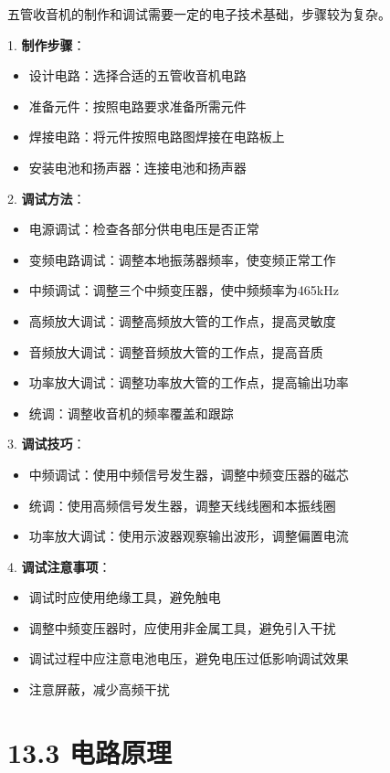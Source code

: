 \documentclass[12pt,UTF8]{ctexbook}
\begin{document}
五管收音机的制作和调试需要一定的电子技术基础，步骤较为复杂。

1. \textbf{制作步骤}：
   \begin{itemize}[leftmargin=3.5em]
   \item 设计电路：选择合适的五管收音机电路
   \item 准备元件：按照电路要求准备所需元件
   \item 焊接电路：将元件按照电路图焊接在电路板上
   \item 安装电池和扬声器：连接电池和扬声器
   \end{itemize}

2. \textbf{调试方法}：
   \begin{itemize}[leftmargin=3.5em]
   \item 电源调试：检查各部分供电电压是否正常
   \item 变频电路调试：调整本地振荡器频率，使变频正常工作
   \item 中频调试：调整三个中频变压器，使中频频率为465kHz
   \item 高频放大调试：调整高频放大管的工作点，提高灵敏度
   \item 音频放大调试：调整音频放大管的工作点，提高音质
   \item 功率放大调试：调整功率放大管的工作点，提高输出功率
   \item 统调：调整收音机的频率覆盖和跟踪
   \end{itemize}

3. \textbf{调试技巧}：
   \begin{itemize}[leftmargin=3.5em]
   \item 中频调试：使用中频信号发生器，调整中频变压器的磁芯
   \item 统调：使用高频信号发生器，调整天线线圈和本振线圈
   \item 功率放大调试：使用示波器观察输出波形，调整偏置电流
   \end{itemize}

4. \textbf{调试注意事项}：
   \begin{itemize}[leftmargin=3.5em]
   \item 调试时应使用绝缘工具，避免触电
   \item 调整中频变压器时，应使用非金属工具，避免引入干扰
   \item 调试过程中应注意电池电压，避免电压过低影响调试效果
   \item 注意屏蔽，减少高频干扰
   \end{itemize}

\section*{13.3 电路原理}
\end{document}
